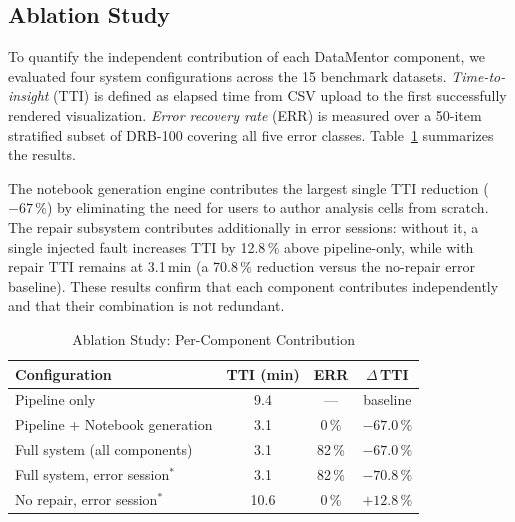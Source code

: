 \documentclass[conference]{IEEEtran}
\begin{document}
\subsection{Ablation Study}

To quantify the independent contribution of each DataMentor component,
we evaluated four system configurations across the 15 benchmark
datasets. \emph{Time-to-insight} (TTI) is defined as elapsed time from
CSV upload to the first successfully rendered visualization.
\emph{Error recovery rate} (ERR) is measured over a 50-item stratified
subset of DRB-100 covering all five error classes. Table~\ref{tab:ablation}
summarizes the results.

The notebook generation engine contributes the largest single TTI
reduction ($-67\,\%$) by eliminating the need for users to author
analysis cells from scratch. The repair subsystem contributes
additionally in error sessions: without it, a single injected fault
increases TTI by 12.8\,\% above pipeline-only, while with repair TTI
remains at 3.1\,min (a 70.8\,\% reduction versus the no-repair error
baseline). These results confirm that each component contributes
independently and that their combination is not redundant.

\begin{table}[t]
\centering
\caption{Ablation Study: Per-Component Contribution}
\label{tab:ablation}
\renewcommand{\arraystretch}{1.1}
\setlength{\tabcolsep}{3pt}
\begin{tabular}{lccc}
\toprule
\textbf{Configuration} & \textbf{TTI (min)} & \textbf{ERR}
                       & \textbf{$\Delta$\,TTI} \\
\midrule
Pipeline only                    & 9.4  & ---    & baseline       \\
Pipeline + Notebook generation   & 3.1  & 0\,\%  & $-67.0\,\%$    \\
Full system (all components)     & 3.1  & 82\,\% & $-67.0\,\%$    \\
Full system, error session$^{*}$ & 3.1  & 82\,\% & $-70.8\,\%$    \\
No repair, error session$^{*}$   & 10.6 & 0\,\%  & $+12.8\,\%$    \\
\bottomrule
\end{tabular}
\smallskip

\end{table}
\end{document}
